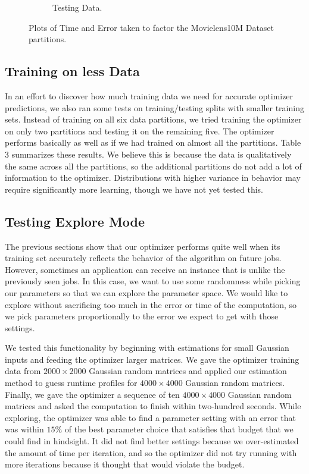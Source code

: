 \begin{figure}
\begin{subfigure}[b]{.45\textwidth}
\begin{center}
		\caption{Testing Data. }
\end{center}
	\end{subfigure}
\hfill
	\caption{Plots of Time and Error taken to factor the Movielens10M Dataset partitions.}	
\end{figure}

\subsection{Training on less Data}
In an effort to discover how much training data we need for accurate optimizer predictions, we also ran some tests on training/testing splits with smaller training sets. Instead of training on all six data partitions, we tried training the optimizer on only two partitions and testing it on the remaining five. The optimizer performs basically as well as if we had trained on almost all the partitions. Table 3 summarizes these results. We believe this is because the data is qualitatively the same across all the partitions, so the additional partitions do not add a lot of information to the optimizer. Distributions with higher variance in behavior may require significantly more learning, though we have not yet tested this. 

\subsection{Testing Explore Mode}
The previous sections show that our optimizer performs quite well when its training set accurately reflects the behavior of the algorithm on future jobs. However, sometimes an application can receive an instance that is unlike the previously seen jobs. In this case, we want to use some randomness while picking our parameters so that we can explore the parameter space. We would like to explore without sacrificing too much in the error or time of the computation, so we pick parameters proportionally to the error we expect to get with those settings. 

We tested this functionality by beginning with estimations for small Gaussian inputs and feeding the optimizer larger matrices. We gave the optimizer training data from $2000 \times 2000$ Gaussian random matrices and applied our estimation method to guess runtime profiles for $4000 \times 4000$ Gaussian random matrices. Finally, we gave the optimizer a sequence of ten $4000 \times 4000$ Gaussian random matrices and asked the computation to finish within two-hundred seconds. While exploring, the optimizer was able to find a parameter setting with an error that was within $15\%$ of the best parameter choice that satisfies that budget that we could find in hindsight. It did not find better settings because we over-estimated the amount of time per iteration, and so the optimizer did not try running with more iterations because it thought that would violate the budget.